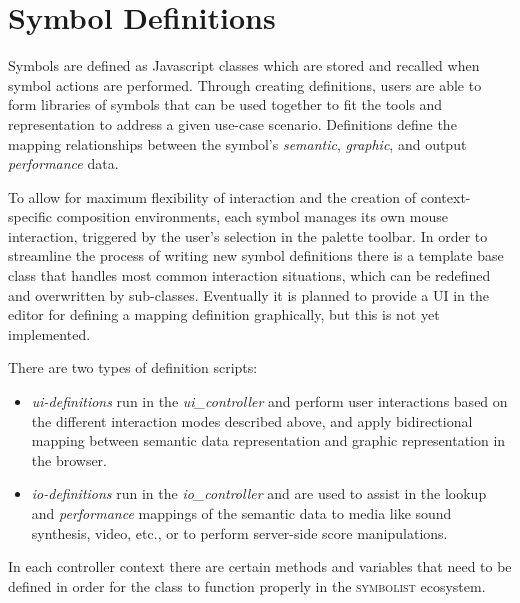 \documentclass{article}
\def\symbolist{\textsc{symbolist}\xspace}
\def\uicontroller{\textit{ui\_controller}\xspace}
\def\iocontroller{\textit{io\_controller}\xspace}
\begin{document}
\section{Symbol Definitions}\label{library_definitions_api}

Symbols are defined as Javascript classes which are stored and recalled when symbol actions are performed. 
Through creating definitions, users are able to form libraries of symbols that can be used together to fit the tools and representation to address a given use-case scenario.
Definitions define the mapping relationships between the symbol's \textit{semantic}, \textit{graphic}, and output \textit{performance} data.

To allow for maximum flexibility of interaction and the creation of context-specific composition environments, each symbol manages its own mouse interaction, triggered by the user's selection in the palette toolbar. 
In order to streamline the process of writing new symbol definitions there is a template base class that handles most common interaction situations, which can be redefined and overwritten by sub-classes. Eventually it is planned to provide a UI in the editor for defining a mapping definition graphically, but this is not yet implemented.

There are two types of definition scripts:
\begin{itemize}\itemsep0pt 
\item \textit{ui-definitions} run in the \uicontroller and perform user interactions based on the different interaction modes described above, and apply bidirectional mapping between semantic data representation and graphic representation in the browser.
\item \textit{io-definitions} run in the \iocontroller and are used to assist in the lookup and \textit{performance} mappings of the semantic data to media like sound synthesis, video, etc., or to perform server-side score manipulations.
\end{itemize}

In each controller context there are certain methods and variables that need to be defined in order for the class to function properly in the \symbolist ecosystem.
\end{document}
